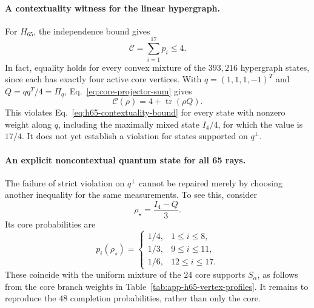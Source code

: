 \documentclass[
  aps,
  pra,
  reprint,
  superscriptaddress,
  amsmath,
  amssymb,
  nofootinbib,
  floatfix
]{revtex4-2}
\theoremstyle{definition}
\theoremstyle{remark}
\begin{document}
\paragraph*{A contextuality witness for the linear hypergraph.}
For $H_{65}$, the independence bound gives
\begin{equation}\label{eq:h65-contextuality-bound}
\mathcal{C}=\sum_{i=1}^{17}p_i\le4.
\end{equation}
In fact, equality holds for every convex mixture of the $393{,}216$ hypergraph states, since each has exactly four active core vertices. With $q=(1,1,1,-1)^T$ and $Q=qq^T/4=\Pi_q$, Eq.~\eqref{eq:core-projector-sum} gives
\begin{equation}\label{eq:h65-contextuality-gap}
\mathcal{C}(\rho)=4+\operatorname{tr}(\rho Q).
\end{equation}
This violates Eq.~\eqref{eq:h65-contextuality-bound} for every state with nonzero weight along $q$, including the maximally mixed state $I_4/4$, for which the value is $17/4$. It does not yet establish a violation for states supported on $q^\perp$.

\paragraph*{An explicit noncontextual quantum state for all 65 rays.}
The failure of strict violation on $q^\perp$ cannot be repaired merely by choosing another inequality for the same measurements. To see this, consider
\begin{equation}\label{eq:h65-noncontextual-density}
\rho_\star=\frac{I_4-Q}{3}.
\end{equation}
Its core probabilities are
\begin{equation}\label{eq:h65-noncontextual-core}
p_i(\rho_\star)=
\begin{cases}
1/4,&1\le i\le8,\\
1/3,&9\le i\le11,\\
1/6,&12\le i\le17.
\end{cases}
\end{equation}
These coincide with the uniform mixture of the $24$ core supports $S_\alpha$, as follows from the core branch weights in Table~\ref{tab:app-h65-vertex-profiles}. It remains to reproduce the $48$ completion probabilities, rather than only the core.
\end{document}
